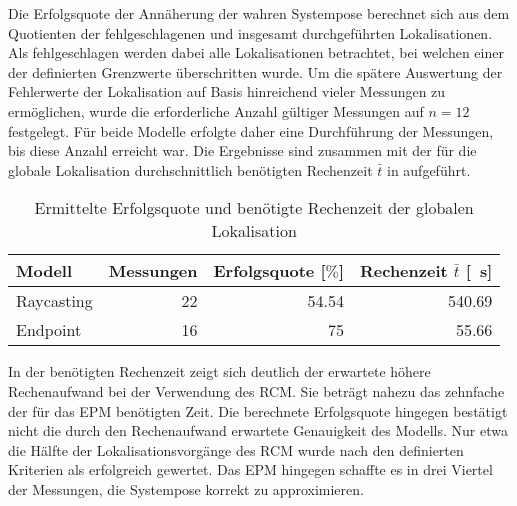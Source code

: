 Die Erfolgsquote der Annäherung der wahren Systempose berechnet sich aus dem Quotienten der fehlgeschlagenen und insgesamt durchgeführten Lokalisationen. Als fehlgeschlagen werden dabei alle Lokalisationen betrachtet, bei welchen einer der definierten Grenzwerte überschritten wurde. Um die spätere Auswertung der Fehlerwerte der Lokalisation auf Basis hinreichend vieler Messungen zu ermöglichen, wurde die erforderliche Anzahl gültiger Messungen auf $n=12$ festgelegt. Für beide Modelle erfolgte daher eine Durchführung der Messungen, bis diese Anzahl erreicht war. Die Ergebnisse sind zusammen mit der für die globale Lokalisation durchschnittlich benötigten Rechenzeit $\bar{t}$ in  aufgeführt.\\

\begin{table}[ht]
\begin{center}
\setlength{\tabcolsep}{18pt}
	\begin{tabular}[ht]{lrrr}
	\toprule
		Modell			& Messungen 	& Erfolgsquote [$\%$]	&	Rechenzeit $\bar{t}$	 [\SI{}{\second}]	\\
		\midrule 
		Raycasting		& \SI{22}{}	& \SI{54,54}{}					&	\SI{540,69}{}			\\ \addlinespace
		Endpoint			& \SI{16}{}	& \SI{75}{}						&	\SI{55,66}{}			\\ 
		\bottomrule
	\end{tabular} 
\caption{Ermittelte Erfolgsquote und benötigte Rechenzeit der globalen Lokalisation}
\label{tab.approx_time}
\end{center}
\end{table}%

In der benötigten Rechenzeit zeigt sich deutlich der erwartete höhere Rechenaufwand bei der Verwendung des RCM. Sie beträgt nahezu das zehnfache der für das EPM benötigten Zeit. Die berechnete Erfolgsquote hingegen bestätigt nicht die durch den Rechenaufwand erwartete Genauigkeit des Modells. Nur etwa die Hälfte der Lokalisationsvorgänge des RCM wurde nach den definierten Kriterien als erfolgreich gewertet. Das EPM hingegen schaffte es in drei Viertel der Messungen, die Systempose korrekt zu approximieren.\\

%

